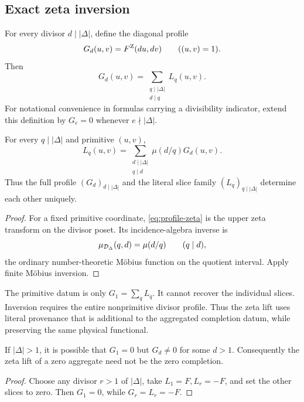 \subsection{Exact zeta inversion}

For every divisor \(d\mid|\Delta|\), define the diagonal profile
\[
 G_d(u,v)=F^{\rm Z}(du,dv)
 \qquad((u,v)=1).
\]
Then
\begin{equation}
G_d(u,v)
=
\sum_{\substack{q\mid|\Delta|\\d\mid q}}L_q(u,v).
\label{eq:profile-zeta}
\end{equation}
For notational convenience in formulas carrying a divisibility
indicator, extend this definition by \(G_e=0\) whenever
\(e\nmid|\Delta|\).

\begin{theorem}
\label{thm:zeta-inversion}
For every \(q\mid|\Delta|\) and primitive \((u,v)\),
\begin{equation}
 \boxed{
 L_q(u,v)
 =
 \sum_{\substack{d\mid|\Delta|\\q\mid d}}
 \mu(d/q)G_d(u,v).}
 \label{eq:zeta-inversion}
\end{equation}
Thus the full profile
\((G_d)_{d\mid|\Delta|}\) and the literal slice family
\((L_q)_{q\mid|\Delta|}\) determine each other uniquely.
\end{theorem}

\begin{proof}
For a fixed primitive coordinate, \eqref{eq:profile-zeta} is the upper
zeta transform on the divisor poset.  Its incidence-algebra inverse is
\[
 \mu_{\mathcal D_\Delta}(q,d)=\mu(d/q)
 \qquad(q\mid d),
\]
the ordinary number-theoretic M\"obius function on the quotient interval.
Apply finite M\"obius inversion.
\end{proof}

\begin{remark}
The primitive datum is only \(G_1=\sum_qL_q\).  It cannot recover the
individual slices.  Inversion requires the entire nonprimitive divisor
profile.  Thus the zeta lift uses literal provenance that is additional
to the aggregated completion datum, while preserving the same physical
functional.
\end{remark}

\begin{corollary}
\label{cor:hidden-content}
If \(|\Delta|>1\), it is possible that \(G_1=0\) but
\(G_d\ne0\) for some \(d>1\).
Consequently the zeta lift of a zero aggregate need not be the zero
completion.
\end{corollary}

\begin{proof}
Choose any divisor \(r>1\) of \(|\Delta|\), take
\(L_1=F,L_r=-F\), and set the other slices to zero.  Then
\(G_1=0\), while \(G_r=L_r=-F\).
\end{proof}
